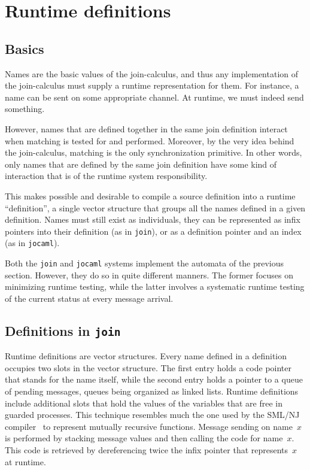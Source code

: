 \section{Runtime definitions}

\label{implementation}
\subsection{Basics}

Names are the basic values of the join-calculus, and thus any
implementation of the join-calculus must supply a runtime
representation for them. For instance, a name can be sent on some
appropriate channel. At runtime, we must indeed send something.

However, names that are defined together in the same join definition
interact when matching is tested for and performed.  Moreover, by the
very idea behind the join-calculus, matching is the only
synchronization primitive.  In other words, only names that are
defined by the same join definition have some kind of interaction that
is of the runtime system responsibility.


This makes possible and desirable to compile a source definition into
a runtime ``definition'', a single vector structure that groups all
the names defined in a given definition.  Names must still exist as
individuals, they can be represented as infix pointers into their
definition (as in {\tt join}), or as a definition pointer and an index
(as in {\tt jocaml}).

Both the {\tt join} and {\tt jocaml} systems implement the automata of
the previous section.  However, they do so in quite different manners.
The former focuses on minimizing runtime testing, while the latter
involves a systematic runtime testing of the current status at every
message arrival.

\subsection{Definitions in {\tt join}}

Runtime definitions are vector structures.  Every name defined in a
definition occupies two slots in the vector structure.  The first
entry holds a code pointer that stands for the name itself, while the
second entry holds a pointer to a queue of pending messages, queues
being organized as linked lists.  Runtime definitions include
additional slots that hold the values of the variables that are free
in guarded processes. This technique resembles much the one used by
the SML/NJ compiler~\cite{Appel-compiling} to represent mutually
recursive functions.  Message sending on name~$x$ is performed by
stacking message values and then calling the code for name~$x$.  This
code is retrieved by dereferencing twice the infix pointer that
represents~$x$ at runtime.


